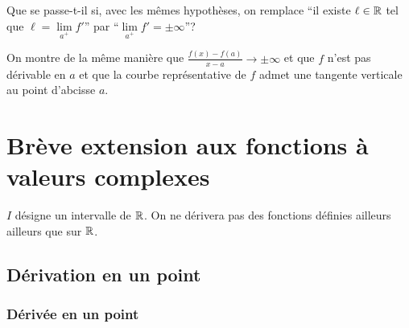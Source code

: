 Que se passe-t-il si, avec les mêmes hypothèses, on remplace ``il existe \(\ell \in \mathbb{R}\) tel que \(\ell=\lim\limits_{a^+}f'\)'' par ``\(\lim\limits_{a^+} f'=\pm \infty\)''?

On montre de la même manière que \(\frac{f(x)-f(a)}{x-a} \to \pm \infty\) et que \(f\) n'est pas dérivable en \(a\) et que la courbe représentative de \(f\) admet une tangente verticale au point d'abcisse \(a\).

\section{Brève extension aux fonctions à valeurs complexes}

\(I\) désigne un intervalle de \(\mathbb{R}\). On ne dérivera pas des fonctions définies ailleurs ailleurs que sur \(\mathbb{R}\).

\subsection{Dérivation en un point}

\subsubsection{Dérivée en un point}

